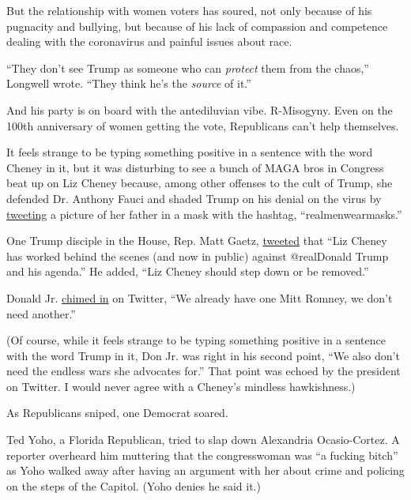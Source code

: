 But the relationship with women voters has soured, not only because of
his pugnacity and bullying, but because of his lack of compassion and
competence dealing with the coronavirus and painful issues about race.

``They don't see Trump as someone who can \emph{protect} them from the
chaos,'' Longwell wrote. ``They think he's the \emph{source} of it.''

And his party is on board with the antediluvian vibe. R-Misogyny. Even
on the 100th anniversary of women getting the vote, Republicans can't
help themselves.

It feels strange to be typing something positive in a sentence with the
word Cheney in it, but it was disturbing to see a bunch of MAGA bros in
Congress beat up on Liz Cheney because, among other offenses to the cult
of Trump, she defended Dr. Anthony Fauci and shaded Trump on his denial
on the virus by
\href{https://twitter.com/liz_cheney/status/1276591702321647616}{tweeting}
a picture of her father in a mask with the hashtag,
``realmenwearmasks.''

One Trump disciple in the House, Rep. Matt Gaetz,
\href{https://twitter.com/mattgaetz/status/1285611975121174528}{tweeted}
that ``Liz Cheney has worked behind the scenes (and now in public)
against @realDonald Trump and his agenda.'' He added, ``Liz Cheney
should step down or be removed.''

Donald Jr.
\href{https://twitter.com/DonaldJTrumpJr/status/1285612789923491842?ref_src=twsrc\%5Etfw\%7Ctwcamp\%5Etweetembed\%7Ctwterm\%5E1285612789923491842\%7Ctwgr\%5E\&ref_url=https\%3A\%2F\%2Fthehill.com\%2Fhomenews\%2Fhouse\%2F508333-trump-jr-on-cheney-we-already-have-one-mitt-romney-we-dont-need-another}{chimed
in} on Twitter, ``We already have one Mitt Romney, we don't need
another.''

(Of course, while it feels strange to be typing something positive in a
sentence with the word Trump in it, Don Jr. was right in his second
point, ``We also don't need the endless wars she advocates for.'' That
point was echoed by the president on Twitter. I would never agree with a
Cheney's mindless hawkishness.)

As Republicans sniped, one Democrat soared.

Ted Yoho, a Florida Republican, tried to slap down Alexandria
Ocasio-Cortez. A reporter overheard him muttering that the congresswoman
was ``a fucking bitch'' as Yoho walked away after having an argument
with her about crime and policing on the steps of the Capitol. (Yoho
denies he said it.)

